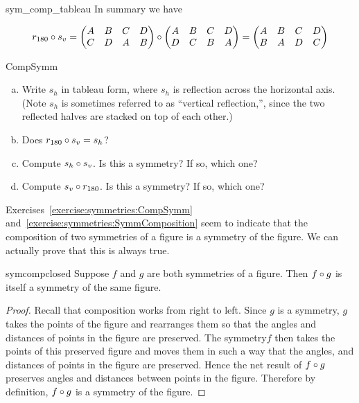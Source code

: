\begin{example}{sym_comp_tableau}
In summary we have

\[ r_{180} \circ s_v = \begin{pmatrix} A & B & C & D \\ C & D & A & B \end{pmatrix} \circ  \begin{pmatrix} A & B & C & D \\ D & C & B & A \end{pmatrix} = \begin{pmatrix} A & B & C & D \\ B & A & D & C \end{pmatrix} \]
 \end{example}

\begin{exercise}{CompSymm}
\begin{enumerate}[(a)]
\item
Write $s_h$ in tableau form, where $s_h$ is reflection across the horizontal axis. (Note $s_h$ is sometimes referred to  as ``vertical reflection,'', since the two reflected halves are stacked on top of each other.)
\item
Does $r_{180} \circ s_v = s_h$?
\item
Compute $s_h \circ  s_v$. Is this a symmetry? If so, which one?
\item
Compute $s_v \circ r_{180}$.  Is this a symmetry? If so, which one?
\end{enumerate}
\end{exercise}

\noindent
Exercises~\ref{exercise:symmetries:CompSymm} and~\ref{exercise:symmetries:SymmComposition} seem to indicate that the composition of two symmetries of a figure is a symmetry of the figure. We can actually prove that this is always true.

\begin{prop}{symcompclosed}
Suppose $f$ and $g$ are both symmetries of a figure.  Then $f \circ g$ is itself a symmetry of the same figure.
\end{prop}

\begin{proof}
Recall that composition works from right to left. Since $g$ is a symmetry, $g$ takes the points of the figure and rearranges them so that the angles and distances of points in the figure are preserved.  The symmetry$f$ then takes the points of this preserved figure and moves them in such a way that the angles, and distances of points in the figure are preserved.  Hence the net result of $f \circ g$ preserves angles and distances between points in the figure.  Therefore by definition, $f \circ g$ is a symmetry of the figure.
\end{proof}

